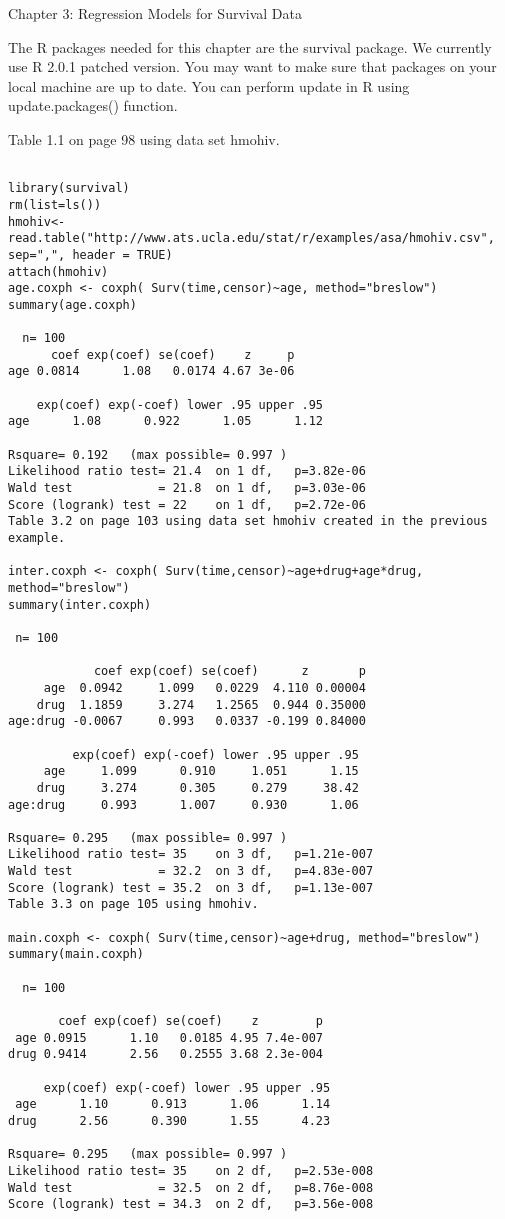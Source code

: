 Chapter 3: Regression Models for Survival Data

The R packages needed for this chapter are the survival package. We currently use R 2.0.1 patched version. You may want to make sure that packages on your local machine are up to date. You can perform update in R using update.packages() function.

Table 1.1 on page 98 using data set hmohiv.

\begin{framed}
\begin{verbatim}

library(survival)
rm(list=ls())
hmohiv<-read.table("http://www.ats.ucla.edu/stat/r/examples/asa/hmohiv.csv", sep=",", header = TRUE) 
attach(hmohiv)
age.coxph <- coxph( Surv(time,censor)~age, method="breslow")
summary(age.coxph)

  n= 100 
      coef exp(coef) se(coef)    z     p
age 0.0814      1.08   0.0174 4.67 3e-06

    exp(coef) exp(-coef) lower .95 upper .95
age      1.08      0.922      1.05      1.12

Rsquare= 0.192   (max possible= 0.997 )
Likelihood ratio test= 21.4  on 1 df,   p=3.82e-06
Wald test            = 21.8  on 1 df,   p=3.03e-06
Score (logrank) test = 22    on 1 df,   p=2.72e-06
Table 3.2 on page 103 using data set hmohiv created in the previous example.

inter.coxph <- coxph( Surv(time,censor)~age+drug+age*drug, method="breslow")
summary(inter.coxph)

 n= 100 

            coef exp(coef) se(coef)      z       p 
     age  0.0942     1.099   0.0229  4.110 0.00004
    drug  1.1859     3.274   1.2565  0.944 0.35000
age:drug -0.0067     0.993   0.0337 -0.199 0.84000

         exp(coef) exp(-coef) lower .95 upper .95 
     age     1.099      0.910     1.051      1.15
    drug     3.274      0.305     0.279     38.42
age:drug     0.993      1.007     0.930      1.06

Rsquare= 0.295   (max possible= 0.997 )
Likelihood ratio test= 35    on 3 df,   p=1.21e-007
Wald test            = 32.2  on 3 df,   p=4.83e-007
Score (logrank) test = 35.2  on 3 df,   p=1.13e-007
Table 3.3 on page 105 using hmohiv.

main.coxph <- coxph( Surv(time,censor)~age+drug, method="breslow")
summary(main.coxph)

  n= 100 

       coef exp(coef) se(coef)    z        p 
 age 0.0915      1.10   0.0185 4.95 7.4e-007
drug 0.9414      2.56   0.2555 3.68 2.3e-004

     exp(coef) exp(-coef) lower .95 upper .95 
 age      1.10      0.913      1.06      1.14
drug      2.56      0.390      1.55      4.23

Rsquare= 0.295   (max possible= 0.997 )
Likelihood ratio test= 35    on 2 df,   p=2.53e-008
Wald test            = 32.5  on 2 df,   p=8.76e-008
Score (logrank) test = 34.3  on 2 df,   p=3.56e-008
\end{verbatim}
\end{framed}
